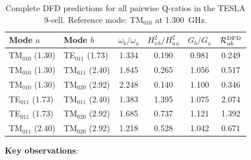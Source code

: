 \documentclass[11pt]{article}
\newcommand{\Heff}{H_n}
\theoremstyle{definition}
\theoremstyle{remark}
\begin{document}
\begin{table}[H]
\centering
\caption{Complete DFD predictions for all pairwise Q-ratios in the
TESLA 9-cell. Reference mode: TM$_{010}$ at 1.300~GHz.}
\label{tab:all-ratios}
\renewcommand{\arraystretch}{1.25}
\begin{tabular}{@{}llcccc@{}}
\toprule
\textbf{Mode $a$} & \textbf{Mode $b$}
& $\omega_b/\omega_a$ & $\Heff^2_b/\Heff^2_a$
& $G_b/G_a$ & $\mathcal{R}_{ab}^{\rm DFD}$ \\
\midrule
TM$_{010}$ (1.30) & TE$_{011}$ (1.73)
  & 1.334 & 0.190 & 0.981 & 0.249 \\
TM$_{010}$ (1.30) & TM$_{011}$ (2.40)
  & 1.845 & 0.265 & 1.056 & 0.517 \\
TM$_{010}$ (1.30) & TM$_{020}$ (2.92)
  & 2.248 & 0.140 & 1.100 & 0.346 \\
TE$_{011}$ (1.73) & TM$_{011}$ (2.40)
  & 1.383 & 1.395 & 1.075 & 2.074 \\
TE$_{011}$ (1.73) & TM$_{020}$ (2.92)
  & 1.685 & 0.737 & 1.121 & 1.392 \\
TM$_{011}$ (2.40) & TM$_{020}$ (2.92)
  & 1.218 & 0.528 & 1.042 & 0.671 \\
\bottomrule
\end{tabular}
\end{table}

\textbf{Key observations}:
\end{document}
